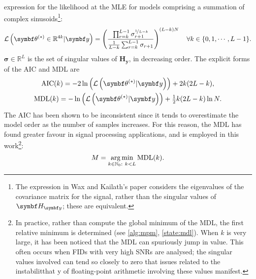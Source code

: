 expression for the likelihood at the \ac{MLE} for models comprising a summation
of complex sinusoids\cite{Wax1985}\footnote{
    The expression in Wax and Kailath's paper considers the eigenvalues of the
    covariance matrix for the signal, rather than the singular values of $\Hy$;
    these are equivalent.
}:
\begin{equation}
    \mathcal{L}\left(\bthstar \in \mathbb{R}^{4k} | \by\right) = \left(
        \frac{
            \prod_{r=k}^{L-1} \sigma_{r+1}^{\nicefrac{1}{L-k}}
        }{
            \frac{1}{L-k} \sum_{r=k}^{L-1} \sigma_{r+1}
        }
        \right)^{(L - k) N}
        \quad \forall k \in \lbrace 0, 1, \cdots, L - 1 \rbrace.
        \label{eq:wax-pdf}
\end{equation}
$\symbf{\sigma} \in
\mathbb{R}^L$ is the set of singular values of $\symbf{H}_{\symbf{y}}$,
in decreasing order. The explicit forms of the \ac{AIC} and \ac{MDL} are
\begin{subequations}
    \begin{gather}
        \operatorname{AIC}(k) = -2 \ln\left( \mathcal{L} \left(\bthstar | \by\right) \right) + 2k(2 L - k), \\
        \operatorname{MDL}(k) = -\ln\left( \mathcal{L} \left(\bthstar | \by\right) \right) + \tfrac{1}{2} k(2 L - k) \ln N. \label{eq:mdl}
    \end{gather}
\end{subequations}
The \ac{AIC} has been shown to be inconsistent since it tends to overestimate
the model order as the number of samples increases\cite{Wax1985}. For this
reason, the \ac{MDL} has found greater favour in signal processing
applications, and is employed in this work\footnote{
    In practice, rather than compute the global minimum of the \ac{MDL}, the
    first relative minimum is determined (see \cref{alg:mpm},
    \cref{state:mdl}). When $k$ is very large, it has been noticed that the
    \ac{MDL} can spuriously jump in value. This often occurs when \acp{FID}
    with very high \acp{SNR} are analysed; the singular values involved
    can tend so closely to zero that issues related to the instabilitthat y of
    floating-point arithmetic involving these values manifest.
}:
\begin{equation}%
    M = \argmin_{k \in \mathbb{N}_0 :\ k < L} \operatorname{MDL} (k).%
\end{equation}%
